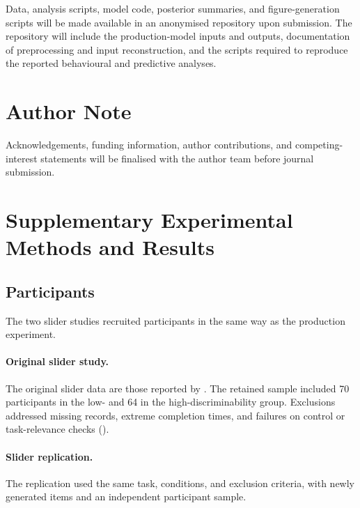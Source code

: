 \documentclass[10pt,a4paper,fleqn]{article}
\begin{document}
Data, analysis scripts, model code, posterior summaries, and figure-generation scripts will be made available in an anonymised repository upon submission.
The repository will include the production-model inputs and outputs, documentation of preprocessing and input reconstruction, and the scripts required to reproduce the reported behavioural and predictive analyses.

\section{Author Note}

Acknowledgements, funding information, author contributions, and competing-interest statements will be finalised with the author team before journal submission.

\printbibliography
\appendix

\section{Supplementary Experimental Methods and Results}
\label{sec:appendix:methods-transparency}

\subsection{Participants}

The two slider studies recruited participants in the same way as the production experiment.

\paragraph{Original slider study.}
The original slider data are those reported by \citet{schlotterbeck2023incremental}.
The retained sample included 70 participants in the low- and 64 in the high-discriminability group.
Exclusions addressed missing records, extreme completion times, and failures on control or task-relevance checks ().

\paragraph{Slider replication.}
\label{sec:exp:slider-replication}
The replication used the same task, conditions, and exclusion criteria, with newly generated items and an independent participant sample.
\end{document}
